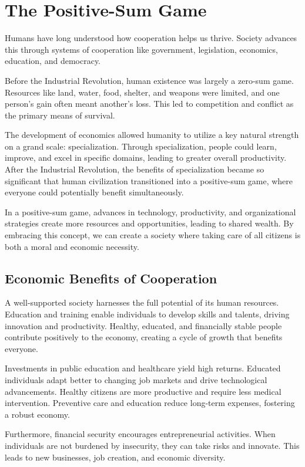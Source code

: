 \section{The Positive-Sum Game}\label{sec:the-positive-sum-game}

Humans have long understood how cooperation helps us thrive.
Society advances this through systems of cooperation like government, legislation, economics, education, and democracy.

Before the Industrial Revolution, human existence was largely a zero-sum game.
Resources like land, water, food, shelter, and weapons were limited, and one person's gain often meant another's loss.
This led to competition and conflict as the primary means of survival.

The development of economics allowed humanity to utilize a key natural strength on a grand scale: specialization.
Through specialization, people could learn, improve, and excel in specific domains, leading to greater overall productivity.
After the Industrial Revolution, the benefits of specialization became so significant that human civilization transitioned into a positive-sum game, where everyone could potentially benefit simultaneously.

In a positive-sum game, advances in technology, productivity, and organizational strategies create more resources and opportunities, leading to shared wealth.
By embracing this concept, we can create a society where taking care of all citizens is both a moral and economic necessity.

\subsection*{Economic Benefits of Cooperation}
A well-supported society harnesses the full potential of its human resources.
Education and training enable individuals to develop skills and talents, driving innovation and productivity.
Healthy, educated, and financially stable people contribute positively to the economy, creating a cycle of growth that benefits everyone.

Investments in public education and healthcare yield high returns.
Educated individuals adapt better to changing job markets and drive technological advancements.
Healthy citizens are more productive and require less medical intervention.
Preventive care and education reduce long-term expenses, fostering a robust economy.

Furthermore, financial security encourages entrepreneurial activities.
When individuals are not burdened by insecurity, they can take risks and innovate.
This leads to new businesses, job creation, and economic diversity.

